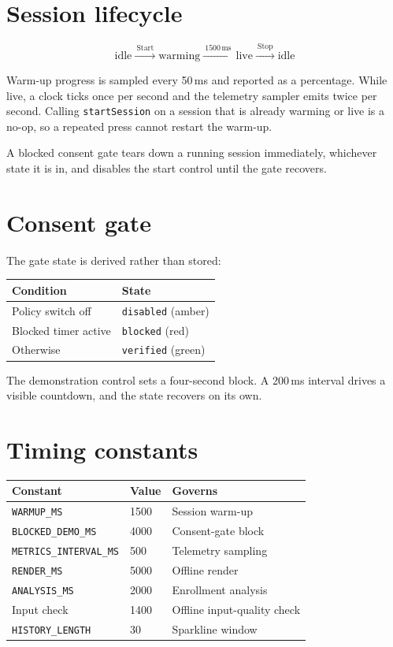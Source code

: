 \documentclass[11pt,a4paper]{report}
\newcommand{\code}[1]{\texttt{\small #1}}
\begin{document}
\section{Session lifecycle}

\[
\text{idle} \xrightarrow{\ \text{Start}\ } \text{warming}
\xrightarrow{\ 1500\,\text{ms}\ } \text{live}
\xrightarrow{\ \text{Stop}\ } \text{idle}
\]

Warm-up progress is sampled every 50\,ms and reported as a percentage. While
live, a clock ticks once per second and the telemetry sampler emits twice per
second. Calling \code{startSession} on a session that is already warming or
live is a no-op, so a repeated press cannot restart the warm-up.

A blocked consent gate tears down a running session immediately, whichever
state it is in, and disables the start control until the gate recovers.

\section{Consent gate}

The gate state is derived rather than stored:

\begin{center}
\begin{tabular}{ll}
\toprule
\textbf{Condition} & \textbf{State} \\
\midrule
Policy switch off & \code{disabled} (amber) \\
Blocked timer active & \code{blocked} (red) \\
Otherwise & \code{verified} (green) \\
\bottomrule
\end{tabular}
\end{center}

The demonstration control sets a four-second block. A 200\,ms interval drives a
visible countdown, and the state recovers on its own.

\section{Timing constants}

\begin{center}
\begin{tabular}{lll}
\toprule
\textbf{Constant} & \textbf{Value} & \textbf{Governs} \\
\midrule
\code{WARMUP\_MS} & 1500 & Session warm-up \\
\code{BLOCKED\_DEMO\_MS} & 4000 & Consent-gate block \\
\code{METRICS\_INTERVAL\_MS} & 500 & Telemetry sampling \\
\code{RENDER\_MS} & 5000 & Offline render \\
\code{ANALYSIS\_MS} & 2000 & Enrollment analysis \\
Input check & 1400 & Offline input-quality check \\
\code{HISTORY\_LENGTH} & 30 & Sparkline window \\
\bottomrule
\end{tabular}
\end{center}
\end{document}
